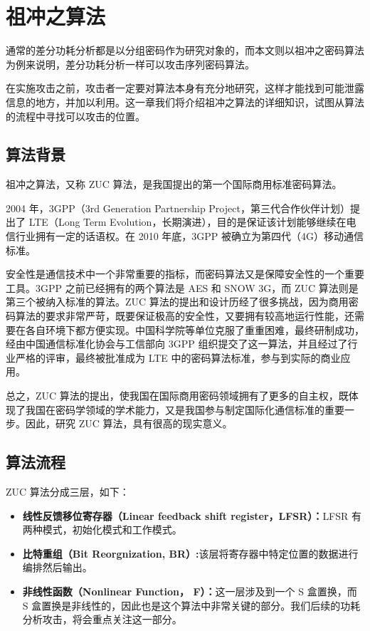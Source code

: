 
\chapter{祖冲之算法}
通常的差分功耗分析都是以分组密码作为研究对象的，而本文则以祖冲之密码算法为例来说明，差分功耗分析一样可以攻击序列密码算法。

在实施攻击之前，攻击者一定要对算法本身有充分地研究，这样才能找到可能泄露信息的地方，并加以利用。这一章我们将介绍祖冲之算法的详细知识，试图从算法的流程中寻找可以攻击的位置。

\section{算法背景} %
祖冲之算法，又称 ZUC 算法，是我国提出的第一个国际商用标准密码算法。

2004 年，3GPP（3rd Generation Partnership Project，第三代合作伙伴计划）提出了 LTE（Long Term Evolution，长期演进），目的是保证该计划能够继续在电信行业拥有一定的话语权。在 2010 年底，3GPP 被确立为第四代（4G）移动通信标准。 \cite{lte}

安全性是通信技术中一个非常重要的指标，而密码算法又是保障安全性的一个重要工具。3GPP 之前已经拥有的两个算法是 AES 和 SNOW 3G，而 ZUC 算法则是第三个被纳入标准的算法。ZUC 算法的提出和设计历经了很多挑战，因为商用密码算法的要求非常严苛，既要保证极高的安全性，又要拥有较高地运行性能，还需要在各自环境下都方便实现。中国科学院等单位克服了重重困难，最终研制成功，经由中国通信标准化协会与工信部向 3GPP 组织提交了这一算法，并且经过了行业严格的评审，最终被批准成为 LTE 中的密码算法标准，参与到实际的商业应用。 \cite{zuc_test}

总之，ZUC 算法的提出，使我国在国际商用密码领域拥有了更多的自主权，既体现了我国在密码学领域的学术能力，又是我国参与制定国际化通信标准的重要一步。因此，研究 ZUC 算法，具有很高的现实意义。

\section{算法流程} %

ZUC 算法分成三层，如下： \cite{zuc_standard}

\begin{itemize}
    \item \textbf{线性反馈移位寄存器（Linear feedback shift register，LFSR）：}LFSR 有两种模式，初始化模式和工作模式。
    \item \textbf{比特重组（Bit Reorgnization, BR）:}该层将寄存器中特定位置的数据进行编排然后输出。
    \item \textbf{非线性函数（Nonlinear Function， F）：}这一层涉及到一个 S 盒置换，而 S 盒置换是非线性的，因此也是这个算法中非常关键的部分。我们后续的功耗分析攻击，将会重点关注这一部分。
\end{itemize}

